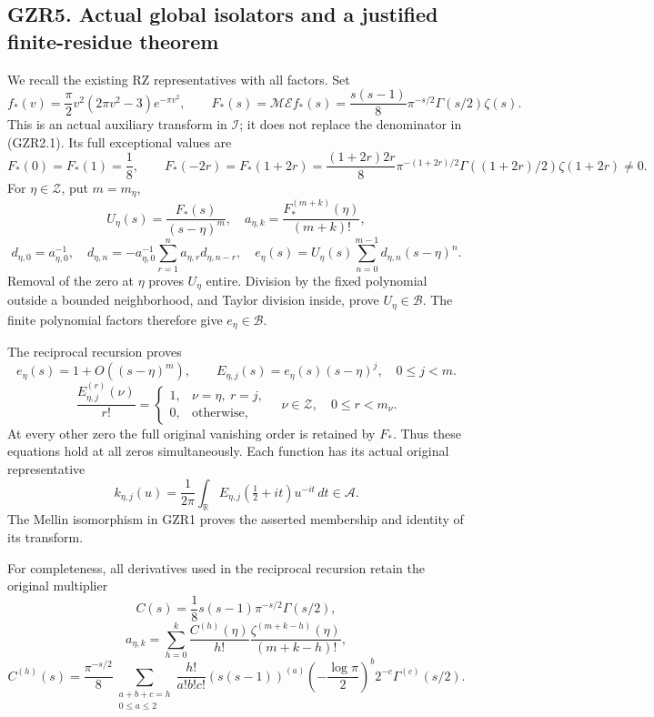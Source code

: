 \subsection{GZR5. Actual global isolators and a justified finite-residue
theorem}\label{gzr5.-actual-global-isolators-and-a-justified-finite-residue-theorem}

We recall the existing RZ representatives with all factors. Set \[
f_*(v)=\frac\pi2v^2(2\pi v^2-3)e^{-\pi v^2},\qquad
F_*(s)=\mathcal M\mathcal Ef_*(s)
=\frac{s(s-1)}8\pi^{-s/2}\Gamma(s/2)\zeta(s).
\tag{GZR5.1}
\] This is an actual auxiliary transform in \(\mathcal I\); it does not
replace the denominator in (GZR2.1). Its full exceptional values are \[
F_*(0)=F_*(1)=\frac18,\qquad
F_*(-2r)=F_*(1+2r)
=\frac{(1+2r)2r}{8}\pi^{-(1+2r)/2}
\Gamma((1+2r)/2)\zeta(1+2r)\ne0.
\tag{GZR5.2}
\] For \(\eta\in\mathscr Z\), put \(m=m_\eta\), \[
U_\eta(s)=\frac{F_*(s)}{(s-\eta)^m},\quad
a_{\eta,k}=\frac{F_*^{(m+k)}(\eta)}{(m+k)!},
\] \[
d_{\eta,0}=a_{\eta,0}^{-1},\quad
d_{\eta,n}=-a_{\eta,0}^{-1}
\sum_{r=1}^{n}a_{\eta,r}d_{\eta,n-r},\quad
e_\eta(s)=U_\eta(s)\sum_{n=0}^{m-1}d_{\eta,n}(s-\eta)^n .
\tag{GZR5.3}
\] Removal of the zero at \(\eta\) proves \(U_\eta\) entire. Division by
the fixed polynomial outside a bounded neighborhood, and Taylor division
inside, prove \(U_\eta\in\mathcal B\). The finite polynomial factors
therefore give \(e_\eta\in\mathcal B\).

The reciprocal recursion proves \[
e_\eta(s)=1+O((s-\eta)^m),\qquad
E_{\eta,j}(s)=e_\eta(s)(s-\eta)^j,\quad 0\le j<m.
\] \[
\frac{E_{\eta,j}^{(r)}(\nu)}{r!}
=
\begin{cases}1,&\nu=\eta,\ r=j,\\0,&\text{otherwise},\end{cases}
\quad \nu\in\mathscr Z,\quad 0\le r<m_\nu.
\tag{GZR5.4}
\] At every other zero the full original vanishing order is retained by
\(F_*\). Thus these equations hold at all zeros simultaneously. Each
function has its actual original representative \[
k_{\eta,j}(u)=\frac1{2\pi}\int_{\mathbb R}
E_{\eta,j}(\tfrac12+it)u^{-it}\,dt\in\mathcal A.
\tag{GZR5.5}
\] The Mellin isomorphism in GZR1 proves the asserted membership and
identity of its transform.

For completeness, all derivatives used in the reciprocal recursion
retain the original multiplier \[
C(s)=\frac18s(s-1)\pi^{-s/2}\Gamma(s/2),
\] \[
a_{\eta,k}=\sum_{h=0}^k
\frac{C^{(h)}(\eta)}{h!}
\frac{\zeta^{(m+k-h)}(\eta)}{(m+k-h)!},
\] \[
C^{(h)}(s)=\frac{\pi^{-s/2}}8
\sum_{\substack{a+b+c=h\\0\le a\le2}}
\frac{h!}{a!b!c!}(s(s-1))^{(a)}
\left(-\frac{\log\pi}{2}\right)^b2^{-c}\Gamma^{(c)}(s/2).
\tag{GZR5.6}
\]

